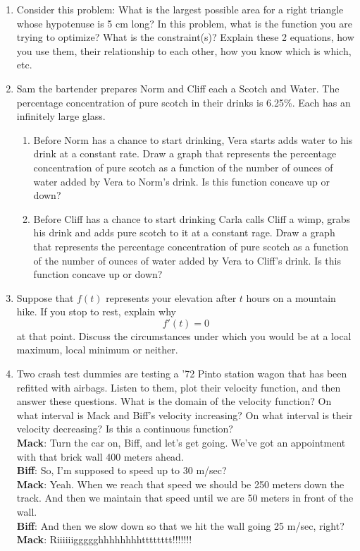 \begin{enumerate}
\item  Consider this problem: What is the largest possible area for a right triangle whose hypotenuse is 5 cm long?  In this problem, what is the function you are trying to optimize?  What is the constraint(s)?  Explain these 2 equations, how you use them, their relationship to each other, how you know which is which, etc.

\item  Sam the bartender prepares Norm and Cliff each a Scotch and Water.  The percentage concentration of pure scotch in their drinks is 6.25\%.  Each has an infinitely large glass.

\begin{enumerate}
	\item Before Norm has a chance to start drinking, Vera starts adds water to his drink at a constant rate.  Draw a graph that represents the percentage concentration of pure scotch as a function of the number of ounces of water added by Vera to Norm's drink.  Is this function concave up or down?
	\item Before Cliff has a chance to start drinking Carla calls Cliff a wimp, grabs his drink and adds pure scotch to it at a constant rage.  Draw a graph that represents the percentage concentration of pure scotch as a function of the number of ounces of water added by Vera to Cliff's drink.  Is this function concave up or down? 
\end{enumerate}

\item  Suppose that $f(t)$ represents your elevation after $t$ hours on a mountain hike.  If you stop to rest, explain why $$f'(t) = 0$$ at that point.  Discuss the circumstances under which you would be at a local maximum, local minimum or neither.  \cite{SM}

\item  Two crash test dummies are testing a '72 Pinto station wagon that has been refitted with airbags.  Listen to them, plot their velocity function, and then answer these questions.  What is the domain of the velocity function?  On what interval is Mack and Biff's velocity increasing?	 On what interval is their velocity decreasing?  Is this a continuous function?
\\ {\bf{Mack}}:  Turn the car on, Biff, and let's get going.  We've got an appointment with that brick wall 400 meters ahead.
\\ {\bf{Biff}}:  So, I'm supposed to speed up to 30 m/sec?
\\ {\bf{Mack}}:  Yeah.  When we reach that speed we should be 250 meters down the track.  And then we maintain that speed until we are 50 meters in front of the wall.
\\ {\bf{Biff}}:  And then we slow down so that we hit the wall going 25 m/sec, right?
\\ {\bf{Mack}}:  Riiiiiiggggghhhhhhhhtttttttt!!!!!!!   


\end{enumerate}
